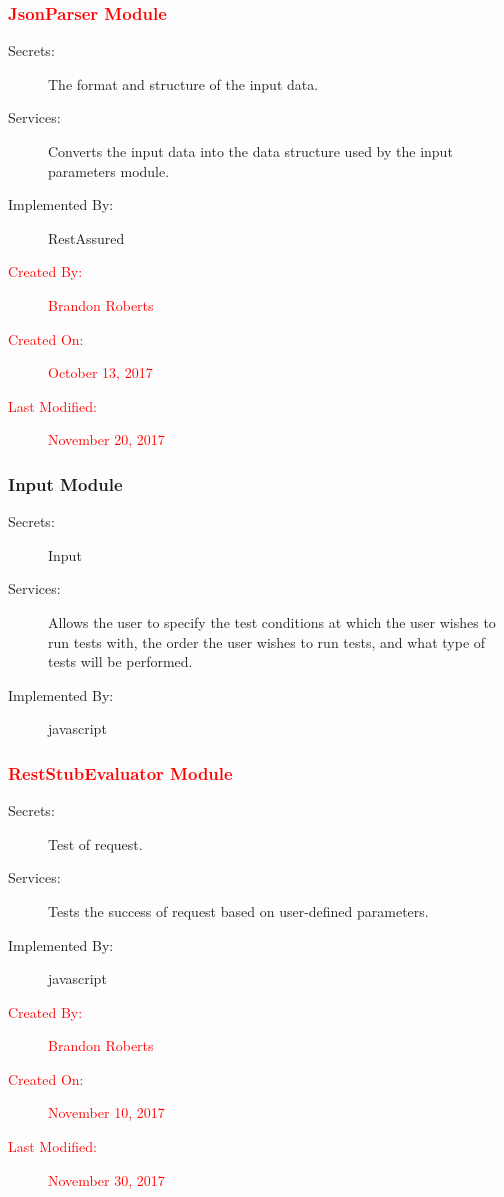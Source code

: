 \documentclass[12pt, titlepage]{article}
\begin{document}
\subsubsection{\textcolor{red}{JsonParser Module}}
\begin{description}
\item[Secrets:]The format and structure of the input data.
\item[Services:]Converts the input data into the data structure used by the
  input parameters module.
\item[Implemented By:] RestAssured
\item[\textcolor{red}{Created By:}] \textcolor{red}{Brandon Roberts}
\item[\textcolor{red}{Created On:}] \textcolor{red}{October 13, 2017}
\item[\textcolor{red}{Last Modified:}] \textcolor{red}{November 20, 2017}
\end{description}


\subsubsection{Input Module}
\begin{description}
\item[Secrets:] Input
\item[Services:] Allows the user to specify the test conditions at which the user wishes to run tests with, the order the user wishes to run tests, and what type of tests will be performed.
\item[Implemented By:] javascript
\end{description}

\subsubsection{\textcolor{red}{RestStubEvaluator Module}}
\begin{description}
\item[Secrets:] Test of request.
\item[Services:] Tests the success of request based on user-defined parameters.
\item[Implemented By:] javascript
\item[\textcolor{red}{Created By:}] \textcolor{red}{Brandon Roberts}
\item[\textcolor{red}{Created On:}] \textcolor{red}{November 10, 2017}
\item[\textcolor{red}{Last Modified:}] \textcolor{red}{November 30, 2017}
\end{description}
\end{document}

